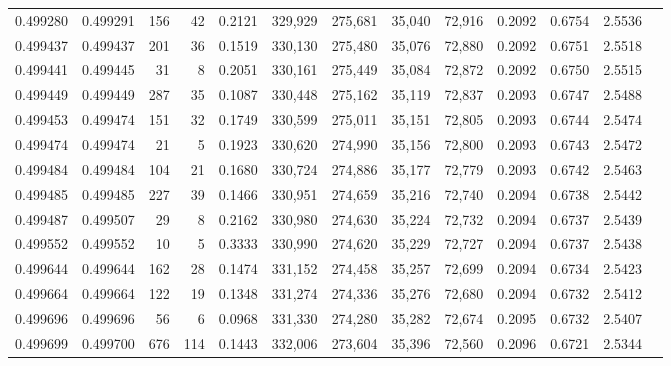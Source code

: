 \begin{tabular}{rrrrrrrrrrrrr}
0.499280 & 0.499291 &   156 &    42 &                                     0.2121 & 329,929 & 275,681 &  35,040 &  72,916 & 0.2092 & 0.6754 & 2.5536 \\
0.499437 & 0.499437 &   201 &    36 &                                     0.1519 & 330,130 & 275,480 &  35,076 &  72,880 & 0.2092 & 0.6751 & 2.5518 \\
0.499441 & 0.499445 &    31 &     8 &                                     0.2051 & 330,161 & 275,449 &  35,084 &  72,872 & 0.2092 & 0.6750 & 2.5515 \\
0.499449 & 0.499449 &   287 &    35 &                                     0.1087 & 330,448 & 275,162 &  35,119 &  72,837 & 0.2093 & 0.6747 & 2.5488 \\
0.499453 & 0.499474 &   151 &    32 &                                     0.1749 & 330,599 & 275,011 &  35,151 &  72,805 & 0.2093 & 0.6744 & 2.5474 \\
0.499474 & 0.499474 &    21 &     5 &                                     0.1923 & 330,620 & 274,990 &  35,156 &  72,800 & 0.2093 & 0.6743 & 2.5472 \\
0.499484 & 0.499484 &   104 &    21 &                                     0.1680 & 330,724 & 274,886 &  35,177 &  72,779 & 0.2093 & 0.6742 & 2.5463 \\
0.499485 & 0.499485 &   227 &    39 &                                     0.1466 & 330,951 & 274,659 &  35,216 &  72,740 & 0.2094 & 0.6738 & 2.5442 \\
0.499487 & 0.499507 &    29 &     8 &                                     0.2162 & 330,980 & 274,630 &  35,224 &  72,732 & 0.2094 & 0.6737 & 2.5439 \\
0.499552 & 0.499552 &    10 &     5 &                                     0.3333 & 330,990 & 274,620 &  35,229 &  72,727 & 0.2094 & 0.6737 & 2.5438 \\
0.499644 & 0.499644 &   162 &    28 &                                     0.1474 & 331,152 & 274,458 &  35,257 &  72,699 & 0.2094 & 0.6734 & 2.5423 \\
0.499664 & 0.499664 &   122 &    19 &                                     0.1348 & 331,274 & 274,336 &  35,276 &  72,680 & 0.2094 & 0.6732 & 2.5412 \\
0.499696 & 0.499696 &    56 &     6 &                                     0.0968 & 331,330 & 274,280 &  35,282 &  72,674 & 0.2095 & 0.6732 & 2.5407 \\
0.499699 & 0.499700 &   676 &   114 &                                     0.1443 & 332,006 & 273,604 &  35,396 &  72,560 & 0.2096 & 0.6721 & 2.5344 \\

\end{tabular}
